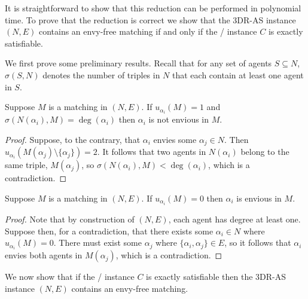 It is straightforward to show that this reduction can be performed in polynomial time. To prove that the reduction is correct we show that the 3DR-AS instance $(N, E)$ contains an envy-free matching if and only if the \porschenxsatvariant/ instance $C$ is exactly satisfiable.

We first prove some preliminary results. Recall that for any set of agents $S \subseteq N$, $\sigma(S, N)$ denotes the number of triples in $N$ that each contain at least one agent in $S$.
\ifdefined\vdkr
\else
{}
\fi

\begin{lem}
\label{lem:threed_efr_as_util1_neighbourhoodthreetriples}
Suppose $M$ is a matching in $(N, E)$. If $u_{\alpha_i}(M)=1$ and $\sigma(N(\alpha_i), M)=\deg(\alpha_i)$ then $\alpha_i$ is not envious in $M$.
\end{lem}
\begin{proof}
Suppose, to the contrary, that $\alpha_i$ envies some $\alpha_j\in N$. Then $u_{\alpha_i}(M(\alpha_j) \setminus \{ \alpha_j \})=2$. It follows that two agents in $N(\alpha_i)$ belong to the same triple, $M(\alpha_j)$, so $\sigma(N(\alpha_i), M) < \deg(\alpha_i)$, which is a contradiction. 
\end{proof}

\begin{lem}
\label{lem:threed_efr_as_util0}
Suppose $M$ is a matching in $(N, E)$. If $u_{\alpha_i}(M)=0$ then $\alpha_i$ is envious in $M$.
\end{lem}
\begin{proof}
Note that by construction of $(N, E)$, each agent has degree at least one. Suppose then, for a contradiction, that there exists some $\alpha_i\in N$ where $u_{\alpha_i}(M)=0$. There must exist some $\alpha_j$ where $\{ \alpha_i, \alpha_j \}\in E$, so it follows that $\alpha_i$ envies both agents in $M(\alpha_j)$, which is a contradiction.
\end{proof}




We now show that if the \porschenxsatvariant/ instance $C$ is exactly satisfiable then the 3DR-AS instance $(N, E)$ contains an envy-free matching.


